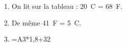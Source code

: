
\medskip

%
%

\begin{enumerate}
\item %
On lit sur la tableau : 20~\degres C = 68~\degres F.
\item %
De même 41~\degres F = 5~\degres C.
\item %


=A3*1,8+32
\end{enumerate}

\vspace{0,5cm}

